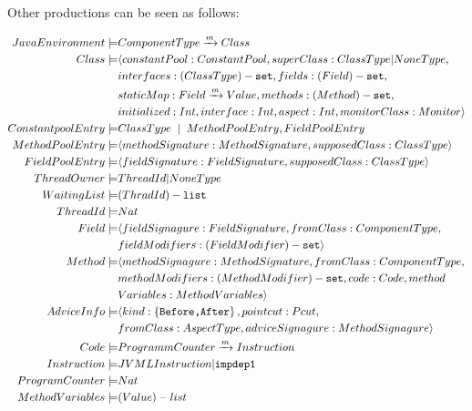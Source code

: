 Other productions can be seen as follows:
\begin{center}
\begin{boxedminipage}{.8\columnwidth}
\begin{align*}
JavaEnvironment \models &  ComponentType \xrightarrow{m}{Class} \\
Class \models & \langle constantPool:ConstantPool,superClass:ClassType|NoneType,\\
&interfaces:(ClassType)-\texttt{set},fields:(Field)-\texttt{set},\\
&staticMap:Field\xrightarrow{m}{Value},methods:(Method)-\texttt{set},\\
&initialized:Int,interface:Int,aspect:Int,monitorClass:Monitor\rangle\\
ConstantpoolEntry \models & ClassType\; \mid \; MethodPoolEntry,FieldPoolEntry\\
MethodPoolEntry \models & \langle methodSignature:MethodSignature,supposedClass:ClassType\rangle\\
FieldPoolEntry \models & \langle fieldSignature:FieldSignature,supposedClass:ClassType\rangle\\
ThreadOwner \models& ThreadId|NoneType\\
WaitingList \models &(ThradId)-\texttt{list}\\
ThreadId \models & Nat\\
Field \models & \langle fieldSignagure:FieldSignature,fromClass:ComponentType,\\
& fieldModifiers:(FieldModifier)-\texttt{set}\rangle\\
Method \models & \langle methodSignagure:MethodSignature,fromClass:ComponentType,\\
&methodModifiers:(MethodModifier)-\texttt{set},code:Code,method\\
&Variables:MethodVariables\rangle\\
AdviceInfo \models & \langle kind:\left\{ \texttt{Before,After} \right\},pointcut:Pcut,\\
&fromClass:AspectType,adviceSignagure:MethodSignagure\rangle\\
Code \models & ProgrammCounter\xrightarrow{m}{Instruction}\\
Instruction \models & JVMLInstruction|\texttt{impdep1}\\
ProgramCounter \models & Nat\\
MethodVariables \models & (Value)-list\\
\end{align*}
\end{boxedminipage}
\end{center}


